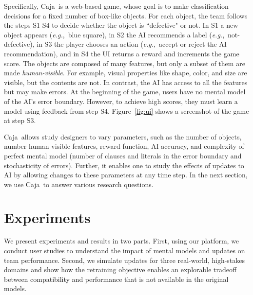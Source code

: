 \documentclass[letterpaper]{article} %
\newcommand{\bug}
    {\mbox{\rule{2mm}{2mm}}}
\newcommand{\Bug}[1]
    {\bug \footnote{BUG: {#1}}}
\newcommand{\eg}{\mbox{\it e.g.}}
\newcommand{\?}{\mbox{?}}
\newcommand{\plat}{{\sc Caja}}
\begin{document}
Specifically, \plat\ is a web-based game, whose goal is to make classification decisions for a fixed number of box-like objects.  For each object, the team follows the steps S1-S4 to decide whether the object is ``defective" or not. In S1 a new object appears (\eg,\ blue square), in S2 the AI recommends a label (\eg,\ not-defective), in S3 the player chooses an action (\eg,\ accept or reject the AI recommendation), and in S4 the UI returns a reward and increments the game score. The objects are composed of many features, but only a subset of them are made {\em human-visible}.
For example, visual properties like shape, color, and size are visible, but the contents are not. In contrast, the AI has access to all the features but 
may make errors. At the beginning of the game, users have no mental model of the AI's error boundary. However, to achieve high scores, they must learn a model using feedback from step S4. Figure~\ref{fig:ui} shows a screenshot of the game at step S3. %

\plat\ allows study designers to vary parameters, such as the number of objects, number human-visible features, reward function, AI accuracy, and complexity of perfect mental model (number of clauses and literals in the   error boundary and stochasticity of errors). Further, it enables one to study the effects of updates to AI by allowing changes to these parameters at any time step. In the next section, we use \plat\ to answer various research questions.


\section{Experiments}
We present experiments and results in two parts. First, using our platform, we conduct user studies to understand the impact of mental models and updates on team performance. Second, we simulate updates for three real-world, high-stakes domains and show how the retraining objective enables an explorable tradeoff between compatibility and performance that is not available in the original models.
\end{document}
